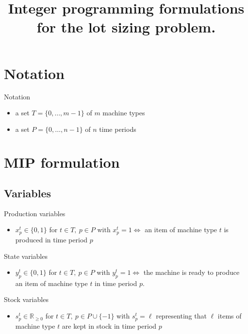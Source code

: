 \documentclass{beamer}
\title{Integer programming formulations for the lot sizing problem.}
\begin{document}
\begin{frame}
  \tableofcontents
\end{frame}

\section{Notation}
\begin{frame}{Notation}
    \begin{itemize}
      \item a set $T = \{0,\ldots,m-1\}$ of $m$ machine types
      \item a set $P = \{0,\ldots,n-1\}$ of $n$ time periods
  \end{itemize}
  \end{frame}

\section{MIP formulation}
\subsection{Variables}
\begin{frame}{Production variables}
  \begin{itemize}
  \item $x^t_p \in \{0,1\}$ for $t \in T,~p \in P$ with $x^t_p = 1
    \Leftrightarrow$ an item of machine type $t$ is produced in time
    period $p$
  \end{itemize}
\end{frame}

\begin{frame}{State variables}
  \begin{itemize}
  \item $y^t_p \in \{0,1\}$ for $t \in T,~p \in P$ with $y^t_p = 1
    \Leftrightarrow$ the machine is ready to produce an item of
    machine type $t$ in time period $p$.
  \end{itemize}
\end{frame}

\begin{frame}{Stock variables}
  \begin{itemize}
  \item $s^t_p \in \mathbb{R}_{\geq0}$ for $t \in T,~p \in P \cup
    \{-1\}$ with $s^t_p = \ell$ representing that $\ell$ items of
    machine type $t$ are kept in stock in time period $p$
  \end{itemize}
\end{frame}
\end{document}
